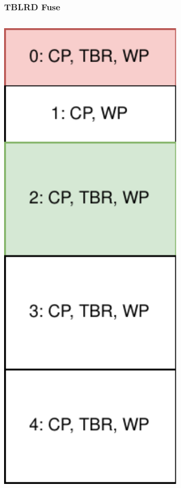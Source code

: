 \documentclass[aspectratio=169]{beamer}
\begin{document}
\begin{frame}[fragile]
	\frametitle{TBLRD Fuse}

	\begin{columns}
		\begin{column}{0.2\textwidth}
			\includegraphics[width=1.0\textwidth]{block2.pdf}
		\end{column}
		\begin{column}{0.8\textwidth}


\end{column}
\end{columns}
\end{frame}
\end{document}
